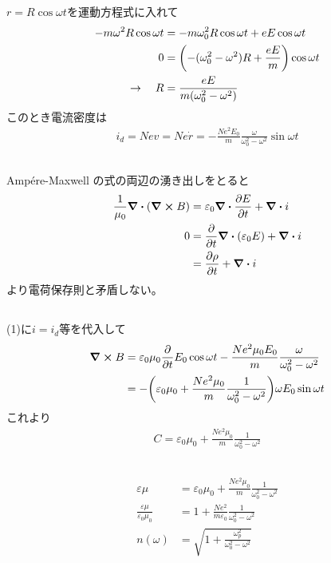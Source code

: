 \documentclass[../../master.tex]{subfiles}
\begin{document}
\subsection{}
\(r=R\cos\omega t\)を運動方程式に入れて
\begin{align}
    -m\omega^2 R\cos\omega t &= -m\omega_0^2 R\cos\omega t + eE\cos\omega t\\
    0 &= \qty(-(\omega_0^2-\omega^2)R+\frac{eE}{m})\cos\omega t\\
    \rightarrow \quad R &=\frac{eE}{m(\omega_0^2-\omega^2)}
\end{align}
このとき電流密度は
\begin{align}
    i_d = Nev = Ne\dot{r} = -\frac{Ne^2E_0}{m}\frac{\omega}{\omega_0^2-\omega^2}\sin\omega t
\end{align}

\subsection{}
Amp\'{e}re-Maxwell の式の両辺の湧き出しをとると
\begin{align}
    \frac{1}{\mu_0}\div(\curl B) &= \varepsilon_0 \div \pdv{E}{t} + \div i\\
    0 &= \pdv{t}\div(\varepsilon_0 E) + \div i\\
    &= \pdv{\rho}{t} +\div i
\end{align}
より電荷保存則と矛盾しない。

\subsection{}
(1)に\(i=i_d\)等を代入して
\begin{align}
    \curl B
    &= \varepsilon_0\mu_0\pdv{t}E_0\cos\omega t -\frac{Ne^2\mu_0E_0}{m}\frac{\omega}{\omega_0^2-\omega^2}\\
    &= -\qty(\varepsilon_0\mu_0+\frac{Ne^2\mu_0}{m}\frac{1}{\omega_0^2-\omega^2})\omega E_0\sin\omega t
\end{align}
これより
\begin{align}
    C = \varepsilon_0\mu_0+\frac{Ne^2\mu_0}{m}\frac{1}{\omega_0^2-\omega^2}
\end{align}

\subsection{}
\begin{align}
    \varepsilon\mu &= \varepsilon_0\mu_0+\frac{Ne^2\mu_0}{m}\frac{1}{\omega_0^2-\omega^2}\\
    \frac{\varepsilon\mu}{\varepsilon_0\mu_0} &= 1+\frac{Ne^2}{m\varepsilon_0}\frac{1}{\omega_0^2-\omega^2}\\
    n(\omega) &= \sqrt{1+\frac{\omega_p^2}{\omega_0^2-\omega^2}}
\end{align}
\end{document}
